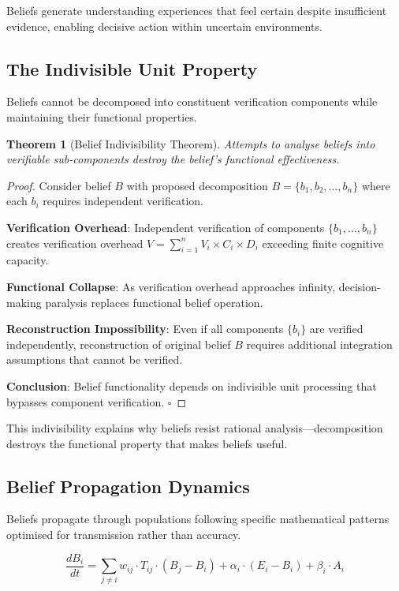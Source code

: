 \documentclass[12pt,a4paper]{article}
\newtheorem{theorem}{Theorem}
\begin{document}
Beliefs generate understanding experiences that feel certain despite insufficient evidence, enabling decisive action within uncertain environments.

\subsection{The Indivisible Unit Property}

Beliefs cannot be decomposed into constituent verification components while maintaining their functional properties.

\begin{theorem}[Belief Indivisibility Theorem]
Attempts to analyse beliefs into verifiable sub-components destroy the belief's functional effectiveness.
\end{theorem}

\begin{proof}
Consider belief $B$ with proposed decomposition $B = \{b_1, b_2, ..., b_n\}$ where each $b_i$ requires independent verification.

\textbf{Verification Overhead}: Independent verification of components $\{b_1, ..., b_n\}$ creates verification overhead $V = \sum_{i=1}^{n} V_i \times C_i \times D_i$ exceeding finite cognitive capacity.

\textbf{Functional Collapse}: As verification overhead approaches infinity, decision-making paralysis replaces functional belief operation.

\textbf{Reconstruction Impossibility}: Even if all components $\{b_i\}$ are verified independently, reconstruction of original belief $B$ requires additional integration assumptions that cannot be verified.

\textbf{Conclusion}: Belief functionality depends on indivisible unit processing that bypasses component verification. $\square$
\end{proof}

This indivisibility explains why beliefs resist rational analysis—decomposition destroys the functional property that makes beliefs useful.

\subsection{Belief Propagation Dynamics}

Beliefs propagate through populations following specific mathematical patterns optimised for transmission rather than accuracy.

\begin{equation}
\frac{dB_i}{dt} = \sum_{j \neq i} w_{ij} \cdot T_{ij} \cdot (B_j - B_i) + \alpha_i \cdot (E_i - B_i) + \beta_i \cdot A_i
\end{equation}
\end{document}
